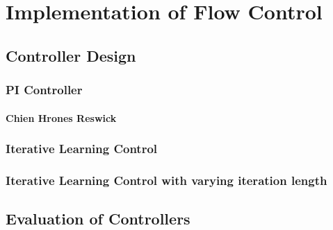 \chapter{Implementation of Flow Control}
\section{Controller Design}
\subsection{PI Controller}
\subsubsection{Chien Hrones Reswick}
\subsection{Iterative Learning Control}
\subsection{Iterative Learning Control with varying iteration length}

\section{Evaluation of Controllers}
%
%
